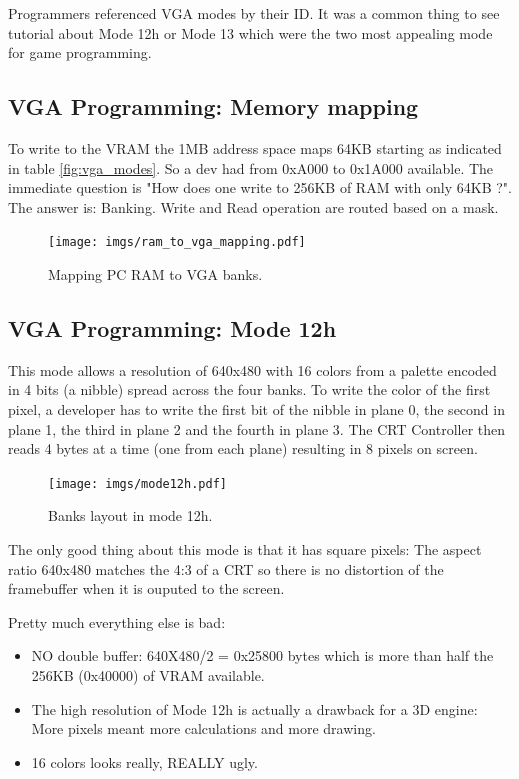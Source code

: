 \documentclass[book.tex]{subfiles}
\begin{document}
 Programmers referenced VGA modes by their ID. It was a common thing to see tutorial about Mode 12h or Mode 13 which were the two most appealing mode for game programming.


 \subsection{VGA Programming: Memory mapping}
To write to the VRAM the 1MB address space maps 64KB starting as indicated in table \ref{fig:vga_modes}. So a dev had from 0xA000 to 0x1A000 available. The immediate question is "How does one write to 256KB of RAM with only 64KB ?". The answer is: Banking. Write and Read operation are routed based on a mask.\\
\par
 \begin{figure}[H]
\centering
  
      \texttt{[image: imgs/ram\_to\_vga\_mapping.pdf]}
    
\caption{Mapping PC RAM to VGA banks.}
\end{figure}



 

 \subsection{VGA Programming: Mode 12h}
 This mode allows a resolution of 640x480 with 16 colors from a palette encoded in 4 bits (a nibble) spread across the four banks. To write the color of the first pixel, a developer has to write the first bit of the nibble in plane 0, the second in plane 1, the third in plane 2 and the fourth in plane 3. The CRT Controller then reads 4 bytes at a time (one from each plane) resulting in 8 pixels on screen.\\
\par
\begin{figure}[H]
\centering
 \texttt{[image: imgs/mode12h.pdf]}
\caption{Banks layout in mode 12h.}
\end{figure}
\par

The only good thing about this mode is that it has square pixels: The aspect ratio 640x480 matches the 4:3 of a CRT so there is no distortion of the framebuffer when it is ouputed to the screen.\\
\par

Pretty much everything else is bad:\\
\begin{itemize}
\item NO double buffer: 640X480/2 = 0x25800 bytes which is more than half the 256KB (0x40000) of VRAM available.
\item The high resolution of Mode 12h is actually a drawback for a 3D engine: More pixels meant more calculations and more drawing.
\item 16 colors looks really, REALLY ugly.
\end{itemize}
\end{document}
